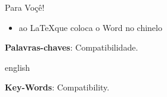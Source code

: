 \documentclass{ifscTCC} %
\begin{document}
\begin{dedicatoria}

    \vspace*{\fill}
        Para Voçê!
    \vspace*{\fill}
    
\end{dedicatoria}


\begin{agradecimentos}
    \begin{itemize}
        \item ao \LaTeX que coloca o Word no chinelo 
    \end{itemize}

\end{agradecimentos}


%	
%    

\setlength{\absparsep}{18pt} %

\begin{resumo}



\noindent
\textbf{Palavras-chaves}: Compatibilidade. 

\end{resumo}

\begin{resumo}[ABSTRACT]
\begin{otherlanguage*}{english}



\noindent
\textbf{Key-Words}: Compatibility. 
\end{otherlanguage*}
\end{resumo}
\end{document}
